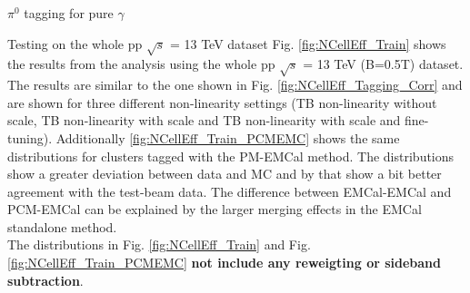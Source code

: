 \documentclass[ALICE]{ALICE_analysis_notes}
\begin{document}
\begin{section}{$\pi^{0}$ tagging for pure $\gamma$}
\begin{figure}[h!]
\end{figure}
	
	
	\begin{subsection}{Testing on the whole pp $\sqrt{s}$ = 13 TeV dataset}
		Fig. \ref{fig:NCellEff_Train} shows the results from the analysis using the whole pp $\sqrt{s}$ = 13 TeV (B=0.5T) dataset. The results are similar to the one shown in Fig. \ref{fig:NCellEff_Tagging_Corr} and are shown for three different non-linearity settings (TB non-linearity without scale, TB non-linearity with scale and TB non-linearity with scale and fine-tuning). Additionally \ref{fig:NCellEff_Train_PCMEMC} shows the same distributions for clusters tagged with the PM-EMCal method. The distributions show a greater deviation between data and MC and by that show a bit better agreement with the test-beam data. The difference between EMCal-EMCal and PCM-EMCal can be explained by the larger merging effects in the EMCal standalone method.\\
		The distributions in Fig. \ref{fig:NCellEff_Train} and Fig.  \ref{fig:NCellEff_Train_PCMEMC} \textbf{not include any reweigting or sideband subtraction}.
		
	\end{subsection}
	
	
	
\end{section}
\end{document}
